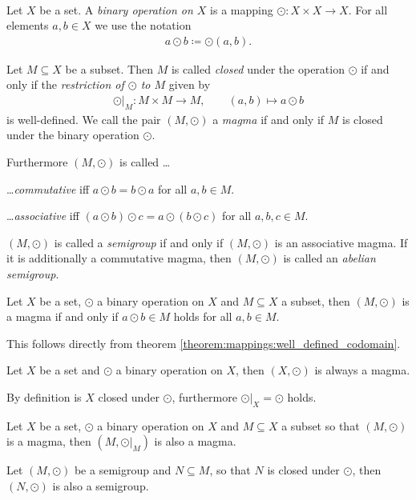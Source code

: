 \begin{definition}~\\
    Let $X$ be a set. A \emph{binary operation on $X$} is a mapping $\odot\colon X\times X\to X$. For all elements $a,b\in X$ we use the notation
    \begin{align}a\odot b\coloneq \odot(a,b).\end{align}
    
    Let $M\subseteq X$ be a subset. Then $M$ is called \emph{closed} under the operation $\odot$ if and only if the \emph{restriction of $\odot$ to $M$} given by
    \begin{align}\odot\vert_M\colon M\times M\to M,\qquad (a,b)\mapsto a\odot b\end{align}
    is well-defined. We call the pair $(M,\odot)$ a \emph{magma} if and only if $M$ is closed under the binary operation $\odot$.

    Furthermore $(M,\odot)$ is called \ldots
    \begin{definitionenumerate}
        \item \dots \emph{commutative} iff $a\odot b=b\odot a$ for all $a,b\in M$.
        \item \dots \emph{associative} iff $(a\odot b)\odot c=a\odot(b\odot c)$ for all $a,b,c\in M$.
    \end{definitionenumerate}

    $(M,\odot)$ is called a \emph{semigroup} if and only if $(M,\odot)$ is an associative magma. If it is additionally a commutative magma, then $(M,\odot)$ is called an \emph{abelian semigroup}.
\end{definition}

\begin{remarks}
    \begin{remarkenumerate}
        \item Let $X$ be a set, $\odot$ a binary operation on $X$  and $M\subseteq X$ a subset, then $(M,\odot)$ is a magma if and only if $a\odot b\in M$ holds for all $a,b\in M$.
        \begin{miniproof}
            This follows directly from theorem \ref{theorem:mappings:well_defined_codomain}.
        \end{miniproof}
        \item Let $X$ be a set and $\odot$ a binary operation on $X$, then $(X,\odot)$ is always a magma.
        \begin{miniproof}
            By definition is $X$ closed under $\odot$, furthermore $\odot\vert_X=\odot$ holds.
        \end{miniproof}
        \item Let $X$ be a set, $\odot$ a binary operation on $X$ and $M\subseteq X$ a subset so that $(M,\odot)$ is a magma, then $(M,\odot\vert_M)$ is also a magma.
        \item\label{remark:groups:semigroup_closed_subset} Let $(M,\odot)$ be a semigroup and $N\subseteq M$, so that $N$ is closed under $\odot$, then $(N,\odot)$ is also a semigroup.
    \end{remarkenumerate}
\end{remarks}


